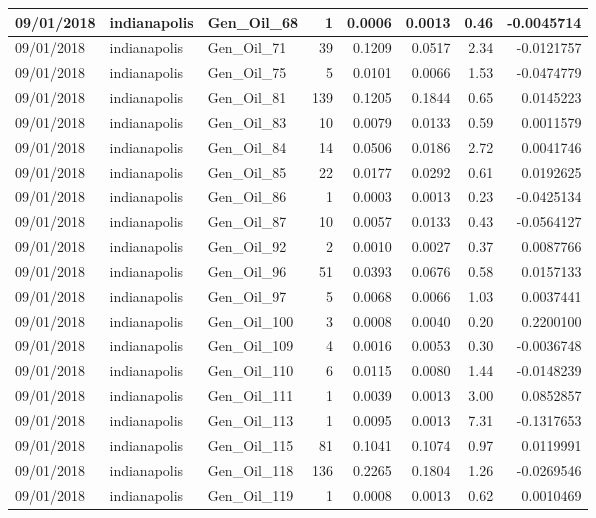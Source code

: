 \documentclass[
  letterpaper,
  DIV=11,
  numbers=noendperiod]{scrartcl}
\begin{document}
\begin{tabular}{l|l|l|r|r|r|r|r}
\hline
09/01/2018 & indianapolis & Gen\_Oil\_68 & 1 & 0.0006 & 0.0013 & 0.46 & -0.0045714\\
\hline
09/01/2018 & indianapolis & Gen\_Oil\_71 & 39 & 0.1209 & 0.0517 & 2.34 & -0.0121757\\
\hline
09/01/2018 & indianapolis & Gen\_Oil\_75 & 5 & 0.0101 & 0.0066 & 1.53 & -0.0474779\\
\hline
09/01/2018 & indianapolis & Gen\_Oil\_81 & 139 & 0.1205 & 0.1844 & 0.65 & 0.0145223\\
\hline
09/01/2018 & indianapolis & Gen\_Oil\_83 & 10 & 0.0079 & 0.0133 & 0.59 & 0.0011579\\
\hline
09/01/2018 & indianapolis & Gen\_Oil\_84 & 14 & 0.0506 & 0.0186 & 2.72 & 0.0041746\\
\hline
09/01/2018 & indianapolis & Gen\_Oil\_85 & 22 & 0.0177 & 0.0292 & 0.61 & 0.0192625\\
\hline
09/01/2018 & indianapolis & Gen\_Oil\_86 & 1 & 0.0003 & 0.0013 & 0.23 & -0.0425134\\
\hline
09/01/2018 & indianapolis & Gen\_Oil\_87 & 10 & 0.0057 & 0.0133 & 0.43 & -0.0564127\\
\hline
09/01/2018 & indianapolis & Gen\_Oil\_92 & 2 & 0.0010 & 0.0027 & 0.37 & 0.0087766\\
\hline
09/01/2018 & indianapolis & Gen\_Oil\_96 & 51 & 0.0393 & 0.0676 & 0.58 & 0.0157133\\
\hline
09/01/2018 & indianapolis & Gen\_Oil\_97 & 5 & 0.0068 & 0.0066 & 1.03 & 0.0037441\\
\hline
09/01/2018 & indianapolis & Gen\_Oil\_100 & 3 & 0.0008 & 0.0040 & 0.20 & 0.2200100\\
\hline
09/01/2018 & indianapolis & Gen\_Oil\_109 & 4 & 0.0016 & 0.0053 & 0.30 & -0.0036748\\
\hline
09/01/2018 & indianapolis & Gen\_Oil\_110 & 6 & 0.0115 & 0.0080 & 1.44 & -0.0148239\\
\hline
09/01/2018 & indianapolis & Gen\_Oil\_111 & 1 & 0.0039 & 0.0013 & 3.00 & 0.0852857\\
\hline
09/01/2018 & indianapolis & Gen\_Oil\_113 & 1 & 0.0095 & 0.0013 & 7.31 & -0.1317653\\
\hline
09/01/2018 & indianapolis & Gen\_Oil\_115 & 81 & 0.1041 & 0.1074 & 0.97 & 0.0119991\\
\hline
09/01/2018 & indianapolis & Gen\_Oil\_118 & 136 & 0.2265 & 0.1804 & 1.26 & -0.0269546\\
\hline
09/01/2018 & indianapolis & Gen\_Oil\_119 & 1 & 0.0008 & 0.0013 & 0.62 & 0.0010469\\

\end{tabular}
\end{document}
